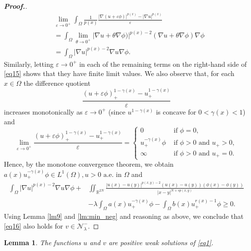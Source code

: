 \documentclass[11pt]{article}
\newtheorem{lemma}{Lemma}[section] %
\newcommand{\Nh}{\mathcal{N}_\la}
\newcommand{\ve}{\varepsilon}
\newcommand{\ga} {\gamma}
\newcommand{\om} {\Omega}
\newcommand{\la} {\lambda}
\newcommand{\na} {\nabla}
\newcommand{\grad}{\nabla}
\begin{document}
\begin{proof}[\bf Proof.]
\begin{align*}
&
    \lim_{\ve\to 0^+}
\int_\om
\frac{1}{p(x)}
\frac{|\grad (u+\ve\phi)|^{p(x)}-
|\grad u|^{p(x)}}{\ve} \\
&=
\int_\om\lim_{\theta\to0^+}|\grad u
+\theta\grad\phi)|^{p(x)-2}(\grad u
+\theta\grad\phi)\grad\phi \nonumber\\
    &=
\int_\om |\grad u|^{p(x)-2}\grad u\grad\phi.
\end{align*}
   Similarly, letting $\ve\to 0^+$
in each of the remaining terms on the 
right-hand side of \eqref{eq15} shows that 
they have finite limit values.
We also observe that, for each $x\in \om$
the difference quotient 
$$
\frac{(u+\ve\phi)_+^{1-\ga(x)}-u_+^{1-\ga(x)}}{\ve}
$$
   increases monotonically as $\ve\to 0^+$
(since $u^{1-\ga(x)}$
is concave for $0<\ga(x)<1$) and 
     \begin{equation*}
        \lim_{\ve\to0^+}
\frac{(u+\ve\phi)_+^{1-\ga(x)}-u_+^{1-\ga(x)}}{\ve}=
        \begin{cases}
0 &\text{ if } \phi=0,\\
u_+^{-\ga(x)}\phi 
&\text{ if }\phi>0 \text{ and }u_+>0,\\
\infty
 &\text{ if }\phi>0 \text{ and }u_+=0.
        \end{cases}
    \end{equation*}
    Hence, by the monotone 
convergence theorem, we obtain 
$a(x)u_+^{-\ga(x)}\phi\in L^1(\om),u>0
\text{ a.e. in }\om$
and 
\begin{align*}
\int_\om|\grad u|^{p(x)-2}\na u\na\phi
+&\iint_{\mathbb{R}^{2N}}
\frac{|u(x)-u(y)|^{p(x,y)-2}(u(x)
-u(y))(\phi(x)-\phi(y))}{|x-y|^{N+sp(x,y)}}\\
    &-\la
\int_\om a(x)u_+^{-\ga(x)}\phi -
\int_\om b(x)u_+^{r(x)-1}\phi\ge0.
    \end{align*}
    Using Lemma \ref{lm9} and 
\ref{lm:min_neg} and reasoning as above, 
we conclude that \eqref{eq16} also holds 
for $v\in\Nh^-$.
\end{proof}


\begin{lemma}\label{lm:existence_result}
    The functions $u$
and $v$
are positive weak solutions of \eqref{eq1}.
\end{lemma}
\end{document}
